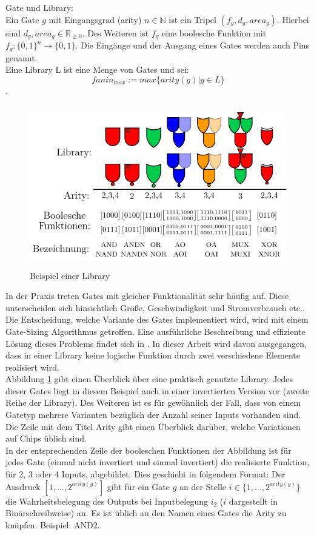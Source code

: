 \documentclass[11pt, a4paper, german]{article}
\begin{document}
\begin{definition}{Gate und Library:}\label{def:gate}\\
Ein Gate $g$ mit Eingangsgrad (arity) $ n \in \mathbb{N}$ ist ein Tripel $(f_g, d_g, area_g)$. Hierbei sind $d_g, area_g \in \mathbb{R}_{\geq 0}$. Des Weiteren ist $f_g$ eine boolesche Funktion mit $ f_g : \{0,1\}^n \rightarrow \{0, 1\} $. Die Eing\"ange und der Ausgang eines Gates werden auch Pins genannt.\\
Eine Library L ist eine Menge von Gates und sei:
\[fanin_{max} := max\{ arity(g) | g \in L \}\].
\end{definition}
\begin{figure}[h]
\begin{center}
 \includegraphics[height = 200pt]{./pictures/compiled/new_library}
 \caption{Beispiel einer Library}
 \label{bild:new_library}
\end{center}
\end{figure}
In der Praxis treten Gates mit gleicher Funktionalit\"at sehr h\"aufig auf. Diese unterscheiden sich hinsichtlich Gr\"o{\ss}e, Geschwindigkeit und Stromverbrauch etc.. Die Entscheidung, welche Variante des Gates implementiert wird, wird mit einem Gate-Sizing Algorithmus getroffen. Eine ausf\"uhrliche Beschreibung und effiziente L\"osung dieses Problems findet sich in \cite{GateSizing}. In dieser Arbeit wird davon ausgegangen, dass in einer Library keine logische Funktion durch zwei verschiedene Elemente realisiert wird.\\
Abbildung \ref{bild:new_library} gibt einen Überblick über eine praktisch genutzte Library. Jedes dieser Gates liegt in diesem Beispiel auch in einer invertierten Version vor (zweite Reihe der Library). Des Weiteren ist es für gewöhnlich der Fall, dass von einem Gatetyp mehrere Varianten bezüglich der Anzahl seiner Inputs vorhanden sind. Die Zeile mit dem Titel Arity gibt einen Überblick darüber, welche Variationen auf Chips üblich sind.\\
In der entsprechenden Zeile der booleschen Funktionen der Abbildung ist für jedes Gate (einmal nicht invertiert und einmal invertiert) die realisierte  Funktion, für 2, 3 oder 4 Inputs, abgebildet. Dies geschieht in folgendem Format: Der Ausdruck $[1,...,2^{arity(g)} ]$ gibt für ein Gate $g$ an der Stelle $i \in \{1,...,2^{arity(g)}\}$ die Wahrheitsbelegung des Outputs bei Inputbelegung $i_2$ ($i$ dargestellt in Binärschreibweise) an. Es ist üblich an den Namen eines Gates die Arity zu knüpfen. Beispiel: AND2. \\
\end{document}
